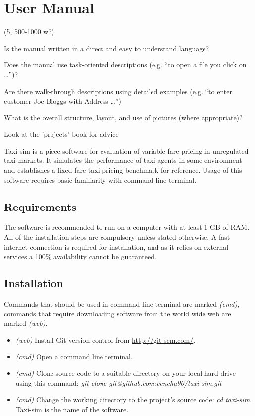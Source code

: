 \newpage
\section{User Manual}
\label{sec:user_manual}


(5, 500-1000 w?)

Is the manual written in a direct and easy to understand language?

Does the manual use task-oriented descriptions (e.g. “to open a file you click
on …”)?

Are there walk-through descriptions using detailed examples (e.g. “to enter
customer Joe Bloggs with Address …”)

What is the overall structure, layout, and use of pictures (where appropriate)?

Look at the 'projects' book for advice


Taxi-sim is a piece software for evaluation of variable fare pricing in
unregulated taxi markets. It simulates the performance of taxi agents in some
environment and establishes a fixed fare taxi pricing benchmark for reference.
Usage of this software requires basic familiarity with command line terminal.


\subsection{Requirements}

The software is recommended to run on a computer with at least 1 GB of RAM. All
of the installation steps are compulsory unless stated otherwise. A fast
internet connection is required for installation, and as it relies on external
services a 100\% availability cannot be guaranteed.


\subsection{Installation}

Commands that should be used in command line terminal are marked
\textit{(cmd)}, commands that require downloading software from the world wide
web are marked \textit{(web)}.

\begin{itemize}
  \item \textit{(web)} Install Git \parencite{Git} version control from 
        \url{http://git-scm.com/}.
  \item \textit{(cmd)} Open a command line terminal.
  \item \textit{(cmd)} Clone source code to a suitable directory on your local
        hard drive using this command: 
        \textit{git clone git@github.com:vencha90/taxi-sim.git}
  \item \textit{(cmd)} Change the working directory to the project's source
        code: \textit{cd taxi-sim}. Taxi-sim is the name of the software.
\end{itemize}

